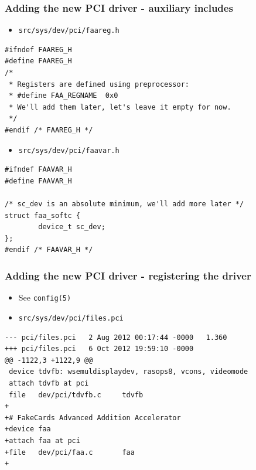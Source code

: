 \documentclass[dvipsnames,table]{beamer}
\begin{document}
\begin{frame}[fragile]
\frametitle{Adding the new PCI driver - auxiliary includes}
\scriptsize
\begin{itemize}
	\item {\tt src/sys/dev/pci/faareg.h}
\end{itemize}
\begin{lstlisting}
#ifndef FAAREG_H
#define FAAREG_H
/* 
 * Registers are defined using preprocessor:
 * #define FAA_REGNAME	0x0
 * We'll add them later, let's leave it empty for now.
 */
#endif /* FAAREG_H */
\end{lstlisting}
\begin{itemize}
	\item {\tt src/sys/dev/pci/faavar.h}
\end{itemize}
\begin{lstlisting}
#ifndef FAAVAR_H
#define FAAVAR_H

/* sc_dev is an absolute minimum, we'll add more later */
struct faa_softc {
        device_t sc_dev;
};
#endif /* FAAVAR_H */
\end{lstlisting}
\end{frame}

\begin{frame}[fragile]
\frametitle{Adding the new PCI driver - registering the driver}
\scriptsize
\begin{itemize}
	\item See {\tt config(5)}
	\item {\tt src/sys/dev/pci/files.pci}
\end{itemize}
\begin{verbatim}
--- pci/files.pci	2 Aug 2012 00:17:44 -0000	1.360
+++ pci/files.pci	6 Oct 2012 19:59:10 -0000
@@ -1122,3 +1122,9 @@
 device	tdvfb: wsemuldisplaydev, rasops8, vcons, videomode
 attach	tdvfb at pci
 file	dev/pci/tdvfb.c		tdvfb	
+
+# FakeCards Advanced Addition Accelerator
+device	faa
+attach	faa at pci
+file	dev/pci/faa.c		faa	
+
\end{verbatim}
\end{frame}
\end{document}
